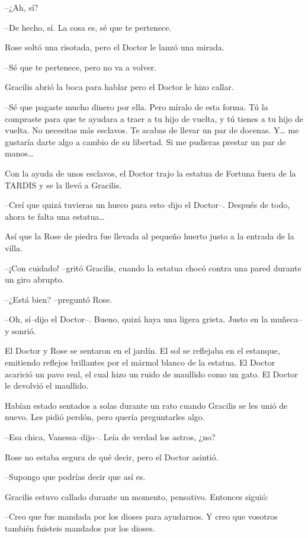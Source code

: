 --¿Ah, sí?

--De hecho, sí. La cosa es, sé que te pertenece.

Rose soltó una risotada, pero el Doctor le lanzó una mirada.

--Sé que te pertenece, pero no va a volver.

Gracilis abrió la boca para hablar pero el Doctor le hizo callar.

--Sé que pagaste mucho dinero por ella. Pero míralo de esta forma. Tú la
compraste para que te ayudara a traer a tu hijo de vuelta, y tú tienes a
tu hijo de vuelta. No necesitas más esclavos. Te acabas de llevar un par
de docenas. Y\ldots{} me gustaría darte algo a cambio de su libertad. Si
me pudieras prestar un par de manos\ldots{}

Con la ayuda de unos esclavos, el Doctor trajo la estatua de Fortuna
fuera de la TARDIS y se la llevó a Gracilis.

--Creí que quizá tuvieras un hueco para esto--dijo el Doctor--. Después
de todo, ahora te falta una estatua\ldots{}

Así que la Rose de piedra fue llevada al pequeño huerto justo a la
entrada de la villa.

--¡Con cuidado! --gritó Gracilis, cuando la estatua chocó contra una
pared durante un giro abrupto.

--¿Está bien? --preguntó Rose.

--Oh, sí--dijo el Doctor--. Bueno, quizá haya una ligera grieta. Justo
en la muñeca--y sonrió.

El Doctor y Rose se sentaron en el jardín. El sol se reflejaba en el
estanque, emitiendo reflejos brillantes por el mármol blanco de la
estatua. El Doctor acarició un pavo real, el cual hizo un ruido de
maullido como un gato. El Doctor le devolvió el maullido.

Habían estado sentados a solas durante un rato cuando Gracilis se les
unió de nuevo. Les pidió perdón, pero quería preguntarles algo.

--Esa chica, Vanessa--dijo--. Leía de verdad los astros, ¿no?

Rose no estaba segura de qué decir, pero el Doctor asintió.

--Supongo que podrías decir que así es.

Gracilis estuvo callado durante un momento, pensativo. Entonces siguió:

--Creo que fue mandada por los dioses para ayudarnos. Y creo que
vosotros también fuisteis mandados por los dioses.

